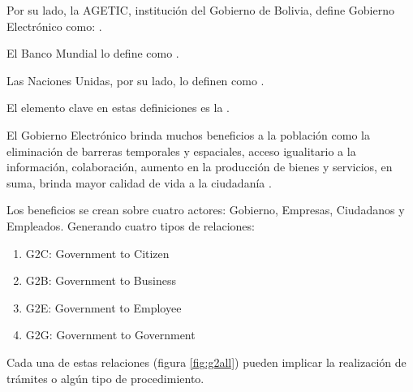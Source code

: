 Por su lado, la AGETIC, institución del Gobierno de Bolivia, define Gobierno Electrónico como: 
 \cite{GobiernoElectronico}.

El Banco Mundial lo define como
.

Las Naciones Unidas, por su lado, lo definen como 
.

El elemento clave en estas definiciones es la \cite{naserGobiernoElectronicoGestion2011}.


El Gobierno Electrónico brinda muchos beneficios a la población como 
la eliminación de barreras temporales y espaciales, 
acceso igualitario a la información, colaboración, aumento en la producción de bienes y servicios, 
en suma, brinda mayor calidad de vida a la ciudadanía \cite[16]{naserGobiernoElectronicoGestion2011}.

Los beneficios se crean sobre cuatro actores: Gobierno, Empresas, Ciudadanos y Empleados. Generando cuatro tipos de relaciones:

\begin{enumerate}
    \item G2C: Government to Citizen
    \item G2B: Government to Business
    \item G2E: Government to Employee
    \item G2G: Government to Government
\end{enumerate}

Cada una de estas relaciones (figura \ref{fig:g2all}) pueden implicar la realización de trámites o algún tipo de procedimiento.

